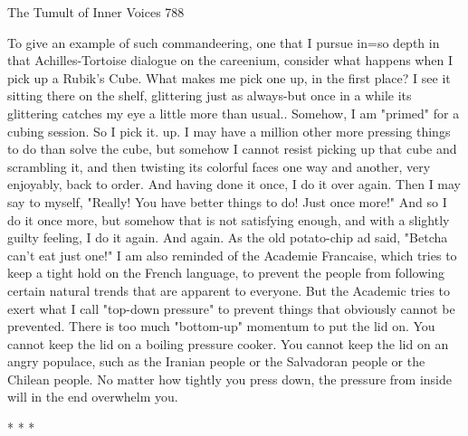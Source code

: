 The Tumult of Inner Voices                                                           788

         To give an example of such commandeering, one that I pursue in=so depth in
that Achilles-Tortoise dialogue on the careenium, consider what happens when I pick
up a Rubik's Cube. What makes me pick one up, in the first place? I see it sitting there
on the shelf, glittering just as always-but once in a while its glittering catches my eye
a little more than usual.. Somehow, I am "primed" for a cubing session. So I pick it.
up. I may have a million other more pressing things to do than solve the cube, but
somehow I cannot resist picking up that cube and scrambling it, and then twisting its
colorful faces one way and another, very enjoyably, back to order. And having done it
once, I do it over again. Then I may say to myself, "Really! You have better things to
do! Just once more!" And so I do it once more, but somehow that is not satisfying
enough, and with a slightly guilty feeling, I do it again. And again.
         As the old potato-chip ad said, "Betcha can't eat just one!" I am also reminded
of the Academie Francaise, which tries to keep a tight hold on the French language, to
prevent the people from following certain natural trends that are apparent to everyone.
But the Academic tries to exert what I call "top-down pressure" to prevent things that
obviously cannot be prevented. There is too much "bottom-up" momentum to put the
lid on. You cannot keep the lid on a boiling pressure cooker. You cannot keep the lid
on an angry populace, such as the Iranian people or the Salvadoran people or the
Chilean people. No matter how tightly you press down, the pressure from inside will
in the end overwhelm you.

                                       *   *   *

